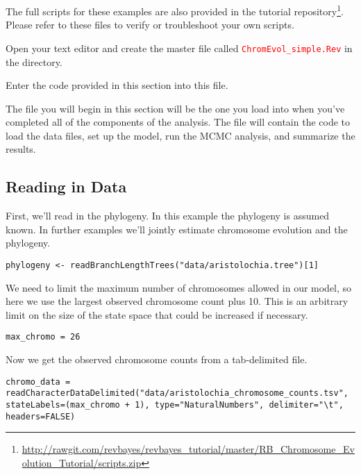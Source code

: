 The full scripts for these examples are also provided in the \RevBayes tutorial repository\footnote{\url{http://rawgit.com/revbayes/revbayes_tutorial/master/RB_Chromosome_Evolution_Tutorial/scripts.zip}}. 
Please refer to these files to verify or troubleshoot your own scripts. 

{\begin{framed}
Open your text editor and create the master \Rev file called {\textcolor{red}{\texttt{ChromEvol\_simple.Rev}}} in the  directory.

Enter the \Rev code provided in this section into this file.
\end{framed}}

The file you will begin in this section will be the one you load into \RevBayes when you've completed all of the components of the analysis. The file will contain the \Rev code to load the data files, set up the model, run the MCMC analysis, and summarize the results.

\medskip
\subsection{Reading in Data}\label{subsub:Exercise-LoadData}

First, we'll read in the phylogeny. In this example the phylogeny is assumed known. In further
examples we'll jointly estimate chromosome evolution and the phylogeny.
{\tt \begin{snugshade*}
\begin{lstlisting}
phylogeny <- readBranchLengthTrees("data/aristolochia.tree")[1]
\end{lstlisting}
\end{snugshade*}}

We need to limit the maximum number of chromosomes allowed in our model,
so here we use the largest observed chromosome count plus 10. This is an arbitrary limit
on the size of the state space that could be increased if necessary.
{\tt \begin{snugshade*}
\begin{lstlisting}
max_chromo = 26 
\end{lstlisting}
\end{snugshade*}}

Now we get the observed chromosome counts from a tab-delimited file.
{\tt \begin{snugshade*}
\begin{lstlisting}
chromo_data = readCharacterDataDelimited("data/aristolochia_chromosome_counts.tsv", stateLabels=(max_chromo + 1), type="NaturalNumbers", delimiter="\t", headers=FALSE)
\end{lstlisting}
\end{snugshade*}}


